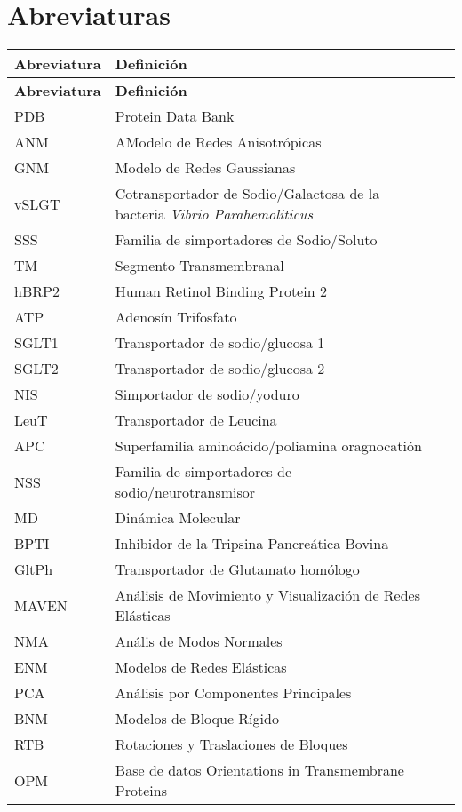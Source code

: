 \section*{Abreviaturas}
\begin{longtable}[l]{lll}\hline
   \textbf{Abreviatura} & \textbf{Definici\'{o}n} \\
 \hline%
  \endfirsthead%
 \textbf{Abreviatura} & \textbf{Definici\'{o}n} \\
  \hline%
 \endhead%
\renewcommand{\arraystretch}{1.4}\label{abre}
PDB&Protein Data Bank\\
ANM&AModelo de Redes Anisotr\'{o}picas\\
GNM&Modelo de Redes Gaussianas\\
vSLGT&Cotransportador de Sodio/Galactosa de la bacteria \textit{Vibrio Parahemoliticus}\\
SSS&Familia de simportadores de Sodio/Soluto\\
TM&Segmento Transmembranal\\ 
hBRP2&Human Retinol Binding Protein 2\\
ATP&Adenos\'{i}n Trifosfato\\
SGLT1&Transportador de sodio/glucosa 1\\
SGLT2&Transportador de sodio/glucosa 2\\
NIS&Simportador de sodio/yoduro\\
LeuT&Transportador de Leucina\\
APC&Superfamilia amino\'{a}cido/poliamina oragnocati\'{o}n\\
NSS&Familia de simportadores de sodio/neurotransmisor \\
MD& Din\'{a}mica Molecular\\
BPTI&Inhibidor de la Tripsina Pancre\'{a}tica Bovina\\
GltPh&Transportador de Glutamato hom\'{o}logo\\
MAVEN& An\'{a}lisis de Movimiento y Visualizaci\'{o}n de Redes El\'{a}sticas\\
NMA&An\'{a}lis de Modos Normales\\
ENM&Modelos de Redes El\'{a}sticas\\
PCA&An\'{a}lisis por Componentes Principales\\
BNM&Modelos de Bloque R\'{i}gido\\
RTB&Rotaciones y Traslaciones de Bloques\\
OPM&Base de datos Orientations in Transmembrane Proteins\\
\hline
\end{longtable}

